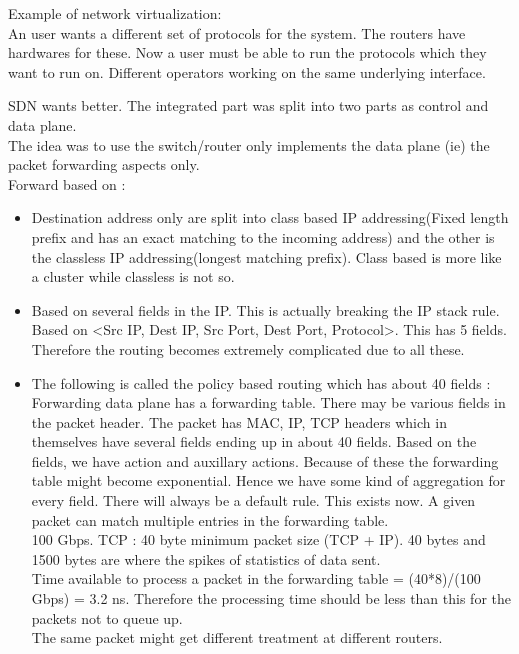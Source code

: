 \documentclass[solution,addpoints,12pt]{exam}
\begin{document}
Example of network virtualization:\\
An user wants a different set of protocols for the system.
The routers have hardwares for these. Now a user must be
able to run the protocols which they want to run on.
Different operators working on the same underlying interface.

SDN wants better. The integrated part was split into two
parts as control and data plane.\\
The idea was to use the switch/router only implements the data plane
(ie) the packet forwarding aspects only.\\

Forward based on :\\
\begin{itemize}
\item
Destination address only are
split into class based IP addressing(Fixed length prefix
and has an exact matching to the incoming address)
and the other is the classless IP addressing(longest matching
prefix). Class based is more like a cluster while classless
is not so.
\item
Based on several fields in the IP. This is actually
breaking the IP stack rule. Based on
<Src IP, Dest IP, Src Port, Dest Port, Protocol>. This has 5 fields.
Therefore the routing becomes extremely complicated due to all these.
\item
The following is called the policy based routing which has about 40 fields :\\
Forwarding data plane has a forwarding table. There may be various
fields in the packet header. The packet has MAC, IP, TCP headers
which in themselves have several fields ending up in about 40 fields.
Based on the fields, we have action and auxillary actions. Because of these
the forwarding table might become exponential. Hence we have some kind
of aggregation for every field. There will always be a default rule.
This exists now. A given packet can match multiple entries in the forwarding
table.\\
100 Gbps. TCP : 40 byte minimum packet size (TCP + IP). 40 bytes and 1500
bytes are where the spikes of statistics of data sent.\\
Time available to process a packet in the
forwarding table = (40*8)/(100 Gbps) = 3.2 ns. Therefore the processing time
should be less than this for the packets not to queue up.\\

The same packet might get different treatment at different routers.
\end{itemize}
\end{document}

